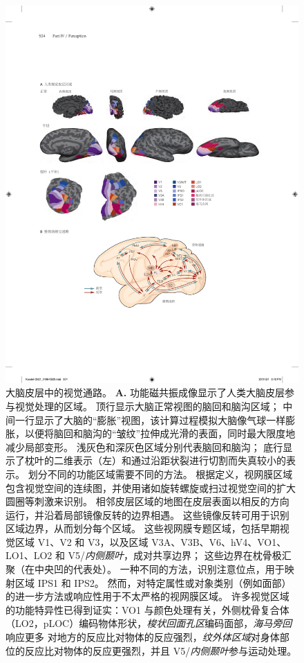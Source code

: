 \begin{figure}[htbp]
	\centering
	\includegraphics[width=0.95\linewidth]{chap21/fig_21_7}
	\caption{大脑皮层中的视觉通路。
		\textbf{A.} 功能磁共振成像显示了人类大脑皮层参与视觉处理的区域。
		顶行显示大脑正常视图的脑回和脑沟区域；
		中间一行显示了大脑的“膨胀”视图，该计算过程模拟大脑像气球一样膨胀，以便将脑回和脑沟的“皱纹”拉伸成光滑的表面，同时最大限度地减少局部变形。
		浅灰色和深灰色区域分别代表脑回和脑沟； 底行显示了枕叶的二维表示（左）和通过沿距状裂进行切割而失真较小的表示。
		划分不同的功能区域需要不同的方法。
		根据定义，视网膜区域包含视觉空间的连续图，并使用诸如旋转螺旋或扫过视觉空间的扩大圆圈等刺激来识别。
		相邻皮层区域的地图在皮层表面以相反的方向运行，并沿着局部镜像反转的边界相遇。
		这些镜像反转可用于识别区域边界，从而划分每个区域。
		这些视网膜专题区域，包括早期视觉区域 V1、V2 和 V3，以及区域 V3A、V3B、V6、hV4、VO1、LO1、LO2 和 V5/\textit{内侧颞叶}，成对共享边界； 这些边界在枕骨极汇聚（在中央凹的代表处）。
		一种不同的方法，识别注意位点，用于映射区域 IPS1 和 IPS2。
		然而，对特定属性或对象类别（例如面部）的进一步方法或响应性用于不太严格的视网膜区域。
		许多视觉区域的功能特异性已得到证实：VO1 与颜色处理有关，外侧枕骨复合体（LO2，pLOC）编码物体形状，\textit{梭状回面孔区}编码面部，\textit{海马旁回}响应更多 对地方的反应比对物体的反应强烈，\textit{纹外体区域}对身体部位的反应比对物体的反应更强烈，并且 V5/\textit{内侧颞叶}参与运动处理。
}
\end{figure}
